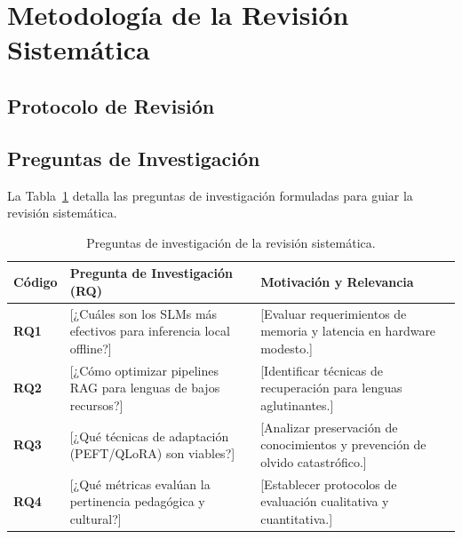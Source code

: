 
\section{Metodología de la Revisión Sistemática}
\label{sec:metodologia_slr}

\subsection{Protocolo de Revisión}

\subsection{Preguntas de Investigación}
\noindent La Tabla~\ref{tab:preguntas_investigacion} detalla las preguntas de investigación formuladas para guiar la revisión sistemática.

\begin{table}[t]
\centering
\caption{Preguntas de investigación de la revisión sistemática.}
\label{tab:preguntas_investigacion}
\begin{tabularx}{\textwidth}{l p{4.6cm} X}
\toprule
\textbf{Código} & \textbf{Pregunta de Investigación (RQ)} & \textbf{Motivación y Relevancia} \\
\midrule
\textbf{RQ1} & [¿Cuáles son los SLMs más efectivos para inferencia local offline?] & [Evaluar requerimientos de memoria y latencia en hardware modesto.] \\
\addlinespace
\textbf{RQ2} & [¿Cómo optimizar pipelines RAG para lenguas de bajos recursos?] & [Identificar técnicas de recuperación para lenguas aglutinantes.] \\
\addlinespace
\textbf{RQ3} & [¿Qué técnicas de adaptación (PEFT/QLoRA) son viables?] & [Analizar preservación de conocimientos y prevención de olvido catastrófico.] \\
\addlinespace
\textbf{RQ4} & [¿Qué métricas evalúan la pertinencia pedagógica y cultural?] & [Establecer protocolos de evaluación cualitativa y cuantitativa.] \\
\bottomrule
\end{tabularx}
\end{table}

